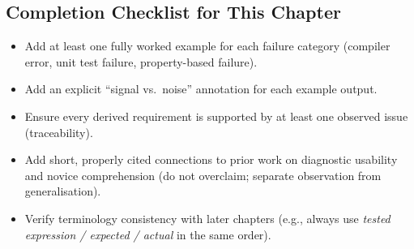 \subsection{Completion Checklist for This Chapter} %
     \label{Completion Checklist for This Chapter} %


\begin{marker}[med]
	\begin{itemize}
		\item Add at least one fully worked example for each failure category (compiler error, unit
            test failure, property-based failure).
		\item Add an explicit ``signal vs.\ noise'' annotation for each example output.
		\item Ensure every derived requirement is supported by at least one observed issue
            (traceability).
		\item Add short, properly cited connections to prior work on diagnostic usability and novice
            comprehension (do not overclaim; separate observation from generalisation).
		\item Verify terminology consistency with later chapters (e.g., always use
            \emph{tested expression / expected / actual} in the same order).
	\end{itemize}
\end{marker}






